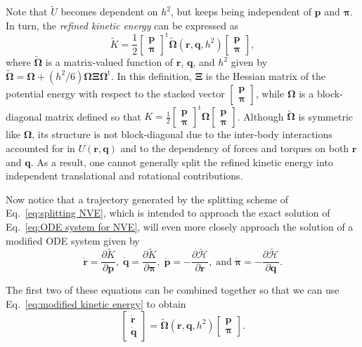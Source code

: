 \documentclass[
	aip,
	jcp,
	reprint,
]{revtex4-1}
\newcommand{\mt}[1]{\boldsymbol{\mathbf{#1}}}          %
\newcommand{\vt}[1]{\boldsymbol{\mathbf{#1}}}          %
\newcommand{\tr}[1]{#1^\text{t}}                       %
\newcommand{\diff}[2]{\frac{\partial #1}{\partial #2}} %
\newcommand{\Ham}[1]{{\mathcal H}_\text{#1}}           %
\newcommand{\timestep}{h}
\newcommand{\refined}[1]{\widetilde{#1}}
\begin{document}
Note that $\refined U$ becomes dependent on $\timestep^2$, but keeps being independent of $\vt p$ and $\vt \pi$.
In turn, the \textit{refined kinetic energy} can be expressed as
\begin{equation}
\label{eq:modified kinetic energy}
\refined K = \frac{1}{2} \tr{\left[\begin{array}{c} \vt p \\ \vt \pi \end{array}\right]} \refined{\mathbf \Omega}(\vt r, \vt q, \timestep^2) \left[\begin{array}{c} \vt p \\ \vt \pi \end{array}\right],
\end{equation}
where $\refined{\mathbf \Omega}$ is a matrix-valued function of $\vt r$, $\vt q$, and $\timestep^2$ given by $\tilde{\mt \Omega} = {\mt \Omega} + ({\timestep^2}/{6}) {\mt \Omega} {\mt \Xi} \tr{\mt \Omega}$.
In this definition, $\mt \Xi$ is the Hessian matrix of the potential energy with respect to the stacked vector $[\substack{\vt p \\ \vt \pi}]$, while ${\mt \Omega}$ is a block-diagonal matrix defined so that $K = \frac{1}{2} \tr{[\substack{\vt p \\ \vt \pi}]} {\mt \Omega} [\substack{\vt p \\ \vt \pi}]$.
Although $\refined{\mathbf \Omega}$ is symmetric like $\mt \Omega$, its structure is not block-diagonal due to the inter-body interactions accounted for in $U(\vt r, \vt q)$ and to the dependency of forces and torques on both $\vt r$ and $\vt q$.
As a result, one cannot generally split the refined kinetic energy into independent translational and rotational contributions.

Now notice that a trajectory generated by the splitting scheme of Eq.~\eqref{eq:splitting NVE}, which is intended to approach the exact solution of Eq.~\eqref{eq:ODE system for NVE}, will even more closely approach the solution of a modified ODE system given by
\begin{equation*}
\dot{\vt r} = \diff{\refined K}{\vt p}, \;
\dot{\vt q} = \diff{\refined K}{\vt \pi}, \;
\dot{\vt p} = -\diff{\refined{\Ham{}}}{\vt r}, \; \text{and} \;
\dot{\vt \pi} = -\diff{\refined{\Ham{}}}{\vt q}.
\end{equation*}

The first two of these equations can be combined together so that we can use Eq.~\eqref{eq:modified kinetic energy} to obtain
\begin{equation}
\label{eq:shadow ODE system}
\left[\begin{array}{c} \dot{\vt r} \\ \dot{\vt q} \end{array}\right] = \refined{\mathbf \Omega}(\vt r, \vt q, \timestep^2) \left[\begin{array}{c} \vt p \\ \vt \pi \end{array}\right].
\end{equation}
\end{document}
